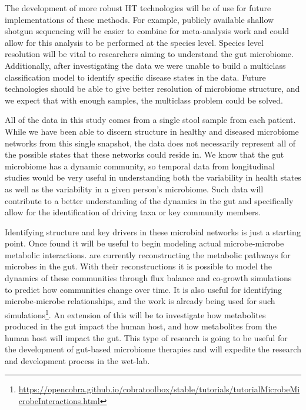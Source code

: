  The development of more robust \acrshort{HT} technologies will be of use for future implementations of these methods. For example, publicly available shallow shotgun sequencing will be easier to combine for meta-analysis work and could allow for this analysis to be performed at the species level. Species level resolution will be vital to researchers aiming to understand the gut microbiome. Additionally, after investigating the \citet{Duvallet2017} data we were unable to build a multiclass classification model to identify specific disease states in the data. Future technologies should be able to give better resolution of microbiome structure, and we expect that with enough samples, the multiclass problem could be solved. 
 
 All of the data in this study comes from a single stool sample from each patient. While we have been able to discern structure in healthy and diseased microbiome networks from this single snapshot, the data does not necessarily represent all of the possible states that these networks could reside in. We know that the gut microbiome has a dynamic community, so temporal data from longitudinal studies would be very useful in understanding both the variability in health states as well as the variability in a given person's microbiome. Such data will contribute to a better understanding of the dynamics in the gut and specifically allow for the identification of driving taxa or key community members.

Identifying structure and key drivers in these microbial networks is just a starting point. Once found it will be useful to begin modeling actual microbe-microbe metabolic interactions.  \citet{Magnusdottir2016} are currently reconstructing the metabolic pathways for microbes in the gut. With their reconstructions it is possible to model the dynamics of these communities through flux balance and co-growth simulations to predict how communities change over time. It is also useful for identifying microbe-microbe relationships, and the \citeauthor{Magnusdottir2016} work is already being used for such simulations\footnote{\url{https://opencobra.github.io/cobratoolbox/stable/tutorials/tutorialMicrobeMicrobeInteractions.html} }.  An extension of this will be to investigate how metabolites produced in the gut impact the human host, and how metabolites from the human host will impact the gut. This type of research is going to be useful for the development of gut-based microbiome therapies and will expedite the research and development process in the wet-lab. 

